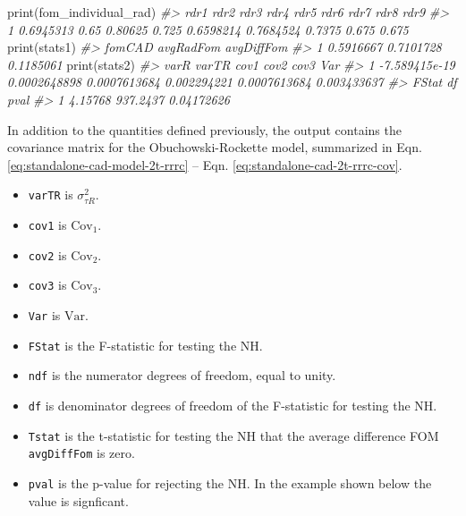 \documentclass[
]{book}
\newenvironment{Shaded}{\begin{snugshade}}{\end{snugshade}}
\newcommand{\CommentTok}[1]{\textcolor[rgb]{0.56,0.35,0.01}{\textit{#1}}}
\newcommand{\FunctionTok}[1]{\textcolor[rgb]{0.00,0.00,0.00}{#1}}
\newcommand{\NormalTok}[1]{#1}
\providecommand{\tightlist}{%
  \setlength{\itemsep}{0pt}\setlength{\parskip}{0pt}}
\begin{document}
\begin{Shaded}
\begin{Highlighting}[]

\FunctionTok{print}\NormalTok{(fom\_individual\_rad)}
\CommentTok{\#\textgreater{}        rdr1 rdr2    rdr3  rdr4      rdr5      rdr6   rdr7  rdr8  rdr9}
\CommentTok{\#\textgreater{} 1 0.6945313 0.65 0.80625 0.725 0.6598214 0.7684524 0.7375 0.675 0.675}
\FunctionTok{print}\NormalTok{(stats1)}
\CommentTok{\#\textgreater{}      fomCAD avgRadFom avgDiffFom}
\CommentTok{\#\textgreater{} 1 0.5916667 0.7101728  0.1185061}
\FunctionTok{print}\NormalTok{(stats2)}
\CommentTok{\#\textgreater{}            varR        varTR         cov1        cov2         cov3         Var}
\CommentTok{\#\textgreater{} 1 {-}7.589415e{-}19 0.0002648898 0.0007613684 0.002294221 0.0007613684 0.003433637}
\CommentTok{\#\textgreater{}     FStat       df       pval}
\CommentTok{\#\textgreater{} 1 4.15768 937.2437 0.04172626}
\end{Highlighting}
\end{Shaded}

In addition to the quantities defined previously, the output contains the covariance matrix for the Obuchowski-Rockette model, summarized in Eqn. \eqref{eq:standalone-cad-model-2t-rrrc} -- Eqn. \eqref{eq:standalone-cad-2t-rrrc-cov}.

\begin{itemize}
\tightlist
\item
  \texttt{varTR} is \(\sigma_{\tau R}^2\).
\item
  \texttt{cov1} is \(\text{Cov}_1\).
\item
  \texttt{cov2} is \(\text{Cov}_2\).
\item
  \texttt{cov3} is \(\text{Cov}_3\).
\item
  \texttt{Var} is \(\text{Var}\).
\item
  \texttt{FStat} is the F-statistic for testing the NH.
\item
  \texttt{ndf} is the numerator degrees of freedom, equal to unity.
\item
  \texttt{df} is denominator degrees of freedom of the F-statistic for testing the NH.
\item
  \texttt{Tstat} is the t-statistic for testing the NH that the average difference FOM \texttt{avgDiffFom} is zero.
\item
  \texttt{pval} is the p-value for rejecting the NH. In the example shown below the value is signficant.
\end{itemize}
\end{document}
